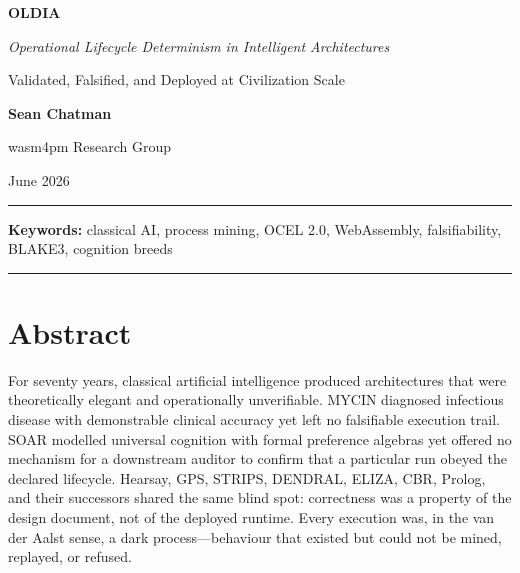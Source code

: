 
\begin{titlepage}
  \centering
  \vspace*{2cm}

  {\LARGE\bfseries OLDIA\par}
  \vspace{0.4cm}
  {\large\itshape Operational Lifecycle Determinism in Intelligent Architectures\par}
  \vspace{0.6cm}
  {\large Validated, Falsified, and Deployed at Civilization Scale\par}

  \vspace{2cm}
  {\large\bfseries Sean Chatman\par}
  \vspace{0.4cm}
  {\normalsize wasm4pm Research Group\par}
  \vspace{0.4cm}
  {\normalsize June 2026\par}

  \vfill

  \noindent\rule{\textwidth}{0.4pt}
  \vspace{0.3cm}

  \noindent\textbf{Keywords:} classical AI, process mining, OCEL 2.0, WebAssembly,
  falsifiability, BLAKE3, cognition breeds

  \vspace{0.3cm}
  \noindent\rule{\textwidth}{0.4pt}
\end{titlepage}

\chapter*{Abstract}

\noindent
For seventy years, classical artificial intelligence produced architectures that were
theoretically elegant and operationally unverifiable.
MYCIN diagnosed infectious disease with demonstrable clinical accuracy yet left no
falsifiable execution trail.
SOAR modelled universal cognition with formal preference algebras yet offered no
mechanism for a downstream auditor to confirm that a particular run obeyed the
declared lifecycle.
Hearsay, GPS, STRIPS, DENDRAL, ELIZA, CBR, Prolog, and their successors shared the
same blind spot: correctness was a property of the design document, not of the
deployed runtime.
Every execution was, in the van der Aalst sense, a dark process---behaviour that
existed but could not be mined, replayed, or refused.

